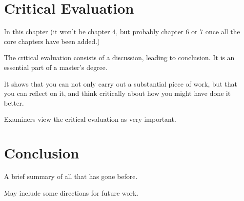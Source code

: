 \documentclass{mscthesis}
\begin{document}
\chapter{Critical Evaluation}

In this chapter (it won’t be chapter 4, but probably chapter 6 or 7 once all the core chapters have been added.)

The critical evaluation consists of a discussion, leading to conclusion.  It is an essential part of a master’s degree.

It shows that you can not only carry out a substantial piece of work, but that you can reflect on it, and think critically about how you might have done it better.

Examiners view the critical evaluation as very important.

\chapter{Conclusion}

A brief summary of all that has gone before.

May include some directions for future work.



\end{document}
